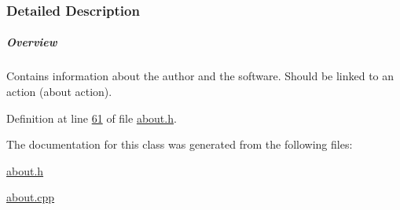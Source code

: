 \subsubsection{Detailed Description}
\subparagraph*{Overview}

Contains information about the author and the software. Should be linked to an action (about action). 

Definition at line \hyperlink{about_8h_source_l00061}{61} of file \hyperlink{about_8h_source}{about.\+h}.



The documentation for this class was generated from the following files\+:\begin{DoxyCompactItemize}
\item 
\hyperlink{about_8h}{about.\+h}\item 
\hyperlink{about_8cpp}{about.\+cpp}\end{DoxyCompactItemize}
